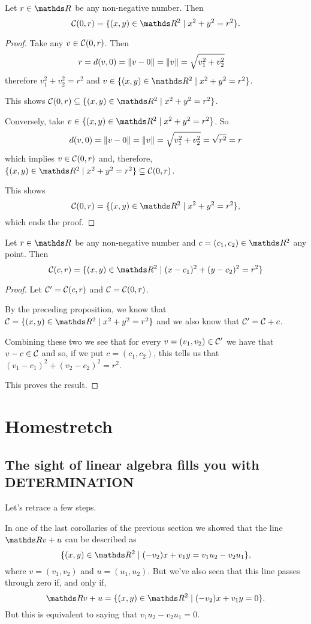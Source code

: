 \begin{prop}
	Let $r\in \R$ be any non-negative number. Then
	\[\mc C(0,r)=\{(x,y)\in \R^2\mid x^2+y^2=r^2\}.\]
\end{prop}
\begin{proof}
	Take any $v\in \mathcal C(0,r)$. Then 
	\begin{align*}
	r&=d(v,0)=\lVert v-0\rVert=\lVert v\rVert=\sqrt{v_1^2+v_2^2}
	\end{align*}therefore $v_1^2+v_2^2=r^2$ and $v\in\{(x,y)\in \R^2\mid x^2+y^2=r^2\}$.
	
	This shows $\mc C(0,r)\subseteq\{(x,y)\in \R^2\mid x^2+y^2=r^2\}$.
	
	\bigskip
	Conversely, take $v\in \{(x,y)\in \R^2\mid x^2+y^2=r^2\}$. So
	\[d(v,0)=\lVert v-0\rVert=\lVert v\rVert=\sqrt{v_1^2+v_2^2}=\sqrt{r^2}=r\]which implies $v\in \mathcal C(0,r)$ and, therefore, $\{(x,y)\in \R^2\mid x^2+y^2=r^2\}\subseteq \mc C(0,r)$.
	
	This shows \[\mc C(0,r)=\{(x,y)\in \R^2\mid x^2+y^2=r^2\},\]which ends the proof.
\end{proof}
\begin{cor}
	Let $r\in \R$ be any non-negative number and $c=(c_1,c_2)\in \R^2$ any point. Then $$\mc C(c,r)=\{(x,y)\in\R^2\mid (x-c_1)^2+(y-c_2)^2=r^2\}$$
\end{cor}
\begin{proof}
	Let $\mathcal C'=\mathcal C(c,r)$ and $\mathcal C=\mathcal C(0,r)$.
	
	By the preceding proposition, we know that $\mc C=\{(x,y)\in\R^2\mid x^2+y^2=r^2\}$ and we also know that $\mathcal C'=\mathcal C+c$.
	
	Combining these two we see that for every $v=(v_1,v_2)\in \mathcal C'$ we have that $v-c\in \mathcal C$ and so, if we put $c=(c_1,c_2)$, this tells us that $(v_1-c_1)^2+(v_2-c_2)^2=r^2$.
	
	This proves the result.
\end{proof}

\newpage
\section{Homestretch}

\subsection{The sight of linear algebra fills you with DETERMINATION}

Let's retrace a few steps.

In one of the last corollaries of the previous section we showed that the line $\R v+u$ can be described as 
\[\{(x,y)\in \R^2\mid (-v_2)x+v_1y=v_1u_2-v_2u_1\},\]where $v=(v_1,v_2)$ and $u=(u_1,u_2)$. But we've also seen that this line passes through zero if, and only if, 
\[\R v+u=\{(x,y)\in\R^2\mid (-v_2)x+v_1y=0\}.\]But this is equivalent to saying that $v_1u_2-v_2u_1=0$.


